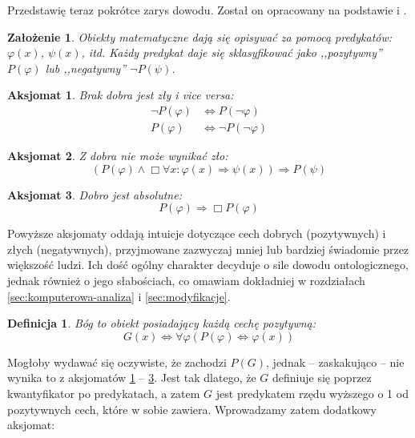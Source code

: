\documentclass[
	runningheads
]{llncs}
\newtheorem{definition-pl}{Definicja}
\newtheorem{axiom-pl}{Aksjomat}
\newtheorem{assumption-pl}{Założenie}
\begin{document}
Przedstawię teraz pokrótce zarys dowodu. Został on opracowany na podstawie \cite{goedel1995} i \cite{sobel2004}. 

\setcounter{axiom-pl}{0}
\setcounter{definition-pl}{0}
\setcounter{theorem-pl}{0}

\begin{assumption-pl}
	Obiekty matematyczne dają się opisywać za pomocą predykatów: $\varphi(x)$, $\psi(x)$, itd. Każdy predykat daje się sklasyfikować jako ,,pozytywny'' $P(\varphi)$ lub ,,negatywny'' $\neg P(\psi)$. 
\end{assumption-pl}
\begin{axiom-pl} \label{axiom:godel1}
	Brak dobra jest zły i vice versa: 
	\begin{align*}
	\neg P(\varphi) & \Leftrightarrow P(\neg \varphi) \\ 
	P(\varphi) & \Leftrightarrow \neg P( \neg \varphi )
	\end{align*}
\end{axiom-pl}
\begin{axiom-pl} \label{axiom:godel2}
	Z dobra nie może wynikać zło: 
	\begin{equation*}
	\left( P(\varphi) \wedge \Box \forall x: \varphi(x) \Rightarrow \psi(x) \right) \Rightarrow P(\psi)
	\end{equation*}
\end{axiom-pl}
\begin{axiom-pl} \label{axiom:godel3}
	Dobro jest absolutne:
	\begin{equation*}
	P(\varphi) \Rightarrow \Box P(\varphi)
	\end{equation*}
\end{axiom-pl}
\noindent Powyższe aksjomaty oddają intuicje dotyczące cech dobrych (pozytywnych) i złych (negatywnych), przyjmowane zazwyczaj mniej lub bardziej świadomie przez większość ludzi. Ich dość ogólny charakter decyduje o sile dowodu ontologicznego, jednak również o jego słabościach, co omawiam dokładniej w rozdziałach \ref{sec:komputerowa-analiza} i \ref{sec:modyfikacje}. 
\begin{definition-pl} \label{def:godel-god}
	Bóg to obiekt posiadający każdą cechę pozytywną: 
	\begin{equation*}
	G(x) \Leftrightarrow \forall \varphi \left( P(\varphi) \Leftrightarrow \varphi(x) \right)
	\end{equation*}
\end{definition-pl}
\noindent Mogłoby wydawać się oczywiste, że zachodzi $P(G)$, jednak -- zaskakująco -- nie wynika to z aksjomatów \ref{axiom:godel1} -- \ref{axiom:godel3}. Jest tak dlatego, że $G$ definiuje się poprzez kwantyfikator po predykatach, a zatem $G$ jest predykatem rzędu wyższego o 1 od pozytywnych cech, które w sobie zawiera. Wprowadzamy zatem dodatkowy aksjomat:
\end{document}
